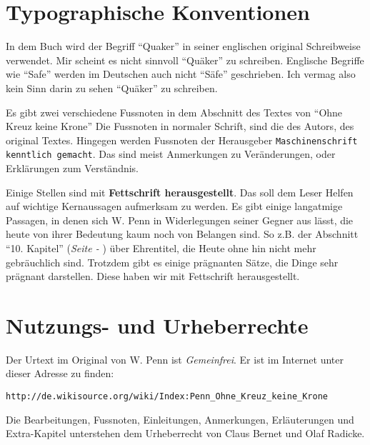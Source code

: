 \chapter{Typographische Konventionen}

In dem Buch wird der Begriff "`Quaker"'  in seiner
englischen original Schreibweise verwendet. Mir scheint es nicht sinnvoll
"`Quäker"' zu schreiben. Englische Begriffe wie "`Safe"' werden im Deutschen
auch nicht "`Säfe"' geschrieben. Ich vermag also kein Sinn darin zu sehen
"`Quäker"' zu schreiben.

\medskip

Es gibt zwei verschiedene Fussnoten in dem Abschnitt des Textes von "`Ohne Kreuz
keine Krone"' Die Fussnoten in normaler Schrift, sind die des Autors, des
original Textes. Hingegen werden Fussnoten der Herausgeber
\texttt{Maschinenschrift kenntlich gemacht}. Das sind meist Anmerkungen zu
Veränderungen, oder Erklärungen zum Verständnis.

\medskip

Einige Stellen sind mit \textbf{Fettschrift herausgestellt}. Das soll dem Leser
Helfen auf wichtige Kernaussagen aufmerksam zu werden. Es gibt einige langatmige
Passagen, in denen sich W. Penn in Widerlegungen seiner Gegner aus lässt, die
heute von ihrer Bedeutung kaum noch von Belangen sind. So z.B. der Abschnitt
"`10. Kapitel"' (\textit{Seite \pageref{kap10} - \pageref{kap10_ende}}) über
Ehrentitel, die Heute ohne hin nicht mehr gebräuchlich sind. Trotzdem gibt es
einige prägnanten Sätze, die Dinge sehr prägnant darstellen. Diese haben wir mit
Fettschrift herausgestellt.

\chapter{Nutzungs- und Urheberrechte}
Der Urtext im Original von W. Penn ist \textit{Gemeinfrei}. Er ist im Internet
unter dieser Adresse zu finden:

\begin{center}
\texttt{http://de.wikisource.org/wiki/Index:Penn\_Ohne\_Kreuz\_keine\_Krone}
\end{center}

Die Bearbeitungen, Fussnoten, Einleitungen, Anmerkungen, Erläuterungen und
Extra-Kapitel unterstehen dem Urheberrecht von Claus Bernet und Olaf Radicke.





